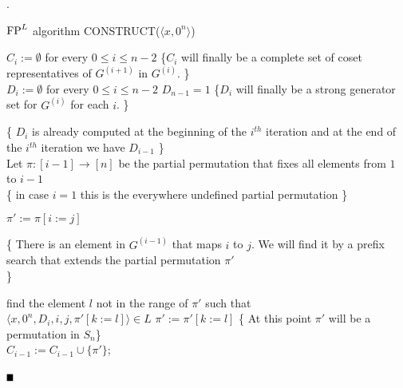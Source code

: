 \documentclass{article}
\newcommand{\bproof}{\noindent{\it Proof}}
\newcommand{\eproof}{\hspace*{\fill}$\rule{2mm}{2mm}$~~~~~\bigskip}
\renewenvironment{proof}{\bproof. }{\eproof}
\newcommand{\FP}{\mbox{\rm FP}}
\renewcommand{\th}[1]{\ensuremath{#1^{th}}}
\renewcommand{\angle}[1]{\langle #1\rangle}
\begin{document}
\begin{proof}
\begin{algorithm}[H]
        \caption{$\FP^L$ algorithm CONSTRUCT($\angle{x,0^n}$)}
        $C_i := \emptyset$ for every $0 \leq i \leq n-2$\;
        \{$C_i$ will finally be a complete set of coset representatives of 
         $G^{(i+1)}$ in $G^{(i)}$.
        \}      \\
        $D_i := \emptyset$ for every $0 \leq i \leq n-2$\;
        $D_{n-1}=1$\;
        \{$D_i$ will finally be a strong generator set for $G^{(i)}$
        for each $i$.
        \}      \\
        {
          \{ $D_i$ is already computed at the beginning of the $\th{i}$ 
          iteration 
         and at the end of the $\th{i}$ iteration we have $D_{i-1}$ 
         \} \\
                Let $\pi:[i-1] \rightarrow [n]$ be the partial 
                permutation that fixes all elements from $1$ to $i-1$ \\
               \{ in case $i = 1$ this is the everywhere undefined
               partial permutation \}\\
                {
                        $\pi' := \pi[i := j]$\;
                        \If{$\angle{x,0^n,D_i,i,j,\pi'} \in L$}
                        {       
                                \{
                                   There is an element in $G^{(i-1)}$ 
                                    that maps $i$ to $j$.
                                    We will find it by a prefix search that
                                    extends the partial permutation $\pi'$\\
                                \}

                                {
                                   find the element $l$ not in the 
                                   range of $\pi'$ such that\\
                                $\angle{x,0^n,D_{i},i,j,\pi'[ k := l]} \in L$\;
                                $\pi' := \pi'[ k := l ]$\;
                                }
                                \{ At this point $\pi'$ will be a 
                                permutation in $S_n$\}\\
                                $C_{i-1}:= C_{i-1} \cup \{\pi'\}$;
                        }
                }

}
\end{algorithm}
\end{proof}
\end{document}
